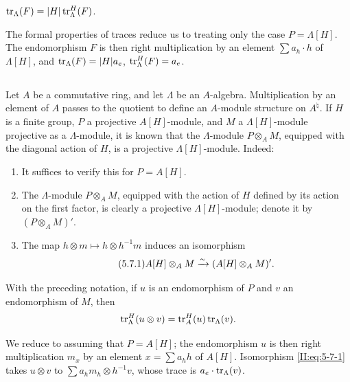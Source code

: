 \begin{proposition_}\label{II:5-6}
$\operatorname{tr}_\Lambda(F) = |H|\operatorname{tr}_\Lambda^H(F)$.
\end{proposition_}

The formal properties of traces reduce us to treating only the case
$P=\Lambda[H]$. The endomorphism $F$ is then right multiplication by an
element $\sum a_h\cdot h$ of $\Lambda[H]$, and
$\operatorname{tr}_\Lambda(F) = |H| a_e$, $\operatorname{tr}_\Lambda^H(F) = a_e$.






\subsection{}\label{II:5-7}

Let $A$ be a commutative ring, and let $\Lambda$ be an $A$-algebra.
Multiplication by an element of $A$ passes to the quotient to define an
$A$-module structure on $A^\natural$. If $H$ is a finite group, $P$ a
projective $A[H]$-module, and $M$ a $\Lambda[H]$-module projective as a
$\Lambda$-module, it is known that the $\Lambda$-module $P\otimes_A M$,
equipped with the diagonal action of $H$, is a projective
$\Lambda[H]$-module. Indeed:
\begin{enumerate}[\indent a)]
  \item It suffices to verify this for $P=A[H]$.
  \item The $\Lambda$-module $P\otimes_A M$, equipped with the action of $H$
    defined by its action on the first factor, is clearly a projective
    $\Lambda[H]$-module; denote it by $(P\otimes_A M)'$.
  \item The map $h\otimes m\mapsto h\otimes h^{-1} m$ induces an isomorphism
    \begin{equation*}\tag{5.7.1}\label{II:eq:5-7-1}
      A[H]\otimes_A M \xrightarrow\sim (A[H]\otimes_A M)' \text{.}
    \end{equation*}
\end{enumerate}






\begin{proposition_}\label{II:5-8}
With the preceding notation, if $u$ is an endomorphism of $P$ and $v$ an
endomorphism of $M$, then
\[
  \operatorname{tr}_\Lambda^H(u\otimes v) = \operatorname{tr}_A^H(u)\operatorname{tr}_\Lambda(v) \text{.}
\]
\end{proposition_}

We reduce to assuming that $P=A[H]$; the endomorphism $u$ is then right
multiplication $m_x$ by an element $x=\sum a_h h$ of $A[H]$. Isomorphism
\eqref{II:eq:5-7-1} takes $u\otimes v$ to
$\sum a_h m_h\otimes h^{-1} v$, whose trace is
$a_e\cdot\operatorname{tr}_\Lambda(v)$.







